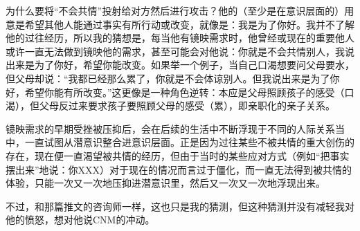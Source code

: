 为什么要将“不会共情”投射给对方然后进行攻击？他的（至少是在意识层面的）用意是希望其他人能通过事实有所行动或改变，就像是：我是为了你好。我并不了解他的过往经历，所以我的猜想是，每当他有镜映需求时，他曾经或现在的重要他人或许一直无法做到镜映他的需求，甚至可能会对他说：你就是不会共情别人，我说出来是为了你好，希望你能改变。如果举一个例子，当自己口渴想要问父母要水，但父母却说：“我都已经那么累了，你就是不会体谅别人。但我说出来是为了你好，希望你能有所改变。”这更像是一种角色逆转：本应是父母照顾孩子的感受（口渴），但父母反过来要求孩子要照顾父母的感受（累），即亲职化的亲子关系。

镜映需求的早期受挫被压抑后，会在后续的生活中不断浮现于不同的人际关系当中，一直试图从潜意识整合进意识层面。正是因为过往某些不被共情的重大创伤的存在，现在便一直渴望被共情的经历，但由于当时的某些应对方式（例如“把事实摆出来”地说：你XXX）对于现在的情况而言过于僵化，而一直无法得到被共情的体验，只能一次又一次地压抑进潜意识里，然后又一次又一次地浮现出来。

不过，和那篇推文的咨询师一样，这也只是我的猜测，但这种猜测并没有减轻我对他的愤怒，想对他说CNM的冲动。

